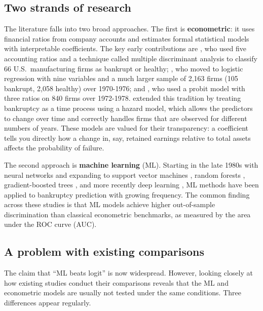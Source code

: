 \documentclass[12pt,a4paper]{article}
\begin{document}
\subsection{Two strands of research}

The literature falls into two broad approaches. The first is
\textbf{econometric}: it uses financial ratios from company accounts and
estimates formal statistical models with interpretable coefficients. The key
early contributions are \cite{altman1968}, who used five accounting ratios
and a technique called multiple discriminant analysis to classify 66 U.S.\
manufacturing firms as bankrupt or healthy; \cite{ohlson1980}, who moved to
logistic regression with nine variables and a much larger sample of 2,163
firms (105 bankrupt, 2,058 healthy) over 1970-1976; and
\cite{zmijewski1984}, who used a probit model with three ratios on 840 firms
over 1972-1978. \cite{shumway2001} extended this tradition by treating
bankruptcy as a time process using a hazard model, which allows the
predictors to change over time and correctly handles firms that are observed
for different numbers of years. These models are valued for their
transparency: a coefficient tells you directly how a change in, say,
retained earnings relative to total assets affects the probability of failure.

The second approach is \textbf{machine learning} (ML). Starting in the
late 1980s with neural networks \citep{odom1990} and expanding to support
vector machines \citep{shin2005, min2005}, random forests \citep{barboza2017},
gradient-boosted trees \citep{zieba2016, carmona2019}, and more recently
deep learning \citep{mai2019, pellegrino2024}, ML methods have been applied
to bankruptcy prediction with growing frequency. The common finding across
these studies is that ML models achieve higher out-of-sample discrimination
than classical econometric benchmarks, as measured by the area under the
ROC curve (AUC).

\subsection{A problem with existing comparisons}

The claim that ``ML beats logit'' is now widespread. However, looking closely
at how existing studies conduct their comparisons reveals that the ML and
econometric models are usually not tested under the same conditions. Three
differences appear regularly.
\end{document}
